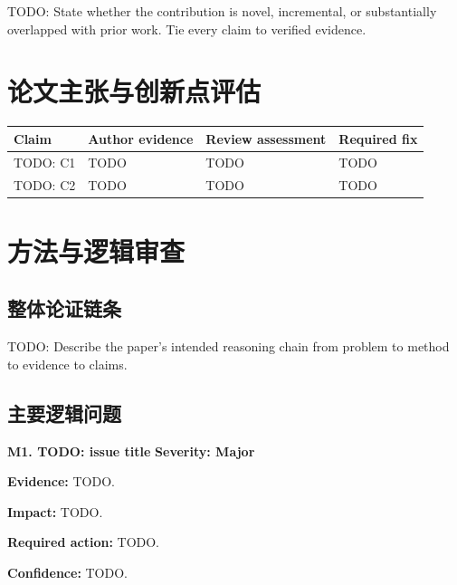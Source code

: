 \documentclass[11pt,a4paper]{article}
\newcommand{\IssueHeading}[3]{\noindent\textbf{#1. #2} \hfill \textbf{Severity: #3}\par}
\newcommand{\Evidence}{\noindent\textbf{Evidence:} }
\newcommand{\Impact}{\noindent\textbf{Impact:} }
\newcommand{\RequiredAction}{\noindent\textbf{Required action:} }
\newcommand{\Confidence}{\noindent\textbf{Confidence:} }
\begin{document}
\begin{innovationbox}
TODO: State whether the contribution is novel, incremental, or substantially overlapped with prior work. Tie every claim to verified evidence.
\end{innovationbox}

\section{论文主张与创新点评估}

\begin{longtable}{p{}p{}p{}p{}}
\toprule
\textbf{Claim} & \textbf{Author evidence} & \textbf{Review assessment} & \textbf{Required fix} \\
\midrule
TODO: C1 & TODO & TODO & TODO \\
TODO: C2 & TODO & TODO & TODO \\
\bottomrule
\end{longtable}

\section{方法与逻辑审查}

\subsection{整体论证链条}
TODO: Describe the paper's intended reasoning chain from problem to method to evidence to claims.

\subsection{主要逻辑问题}
\begin{criticalbox}
\IssueHeading{M1}{TODO: issue title}{Major}
\Evidence TODO.

\Impact TODO.

\RequiredAction TODO.

\Confidence TODO.
\end{criticalbox}

\end{document}
